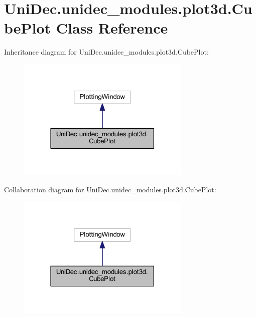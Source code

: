 \hypertarget{class_uni_dec_1_1unidec__modules_1_1plot3d_1_1_cube_plot}{}\section{Uni\+Dec.\+unidec\+\_\+modules.\+plot3d.\+Cube\+Plot Class Reference}
\label{class_uni_dec_1_1unidec__modules_1_1plot3d_1_1_cube_plot}


Inheritance diagram for Uni\+Dec.\+unidec\+\_\+modules.\+plot3d.\+Cube\+Plot\+:\nopagebreak
\begin{figure}[H]
\begin{center}
\leavevmode
\includegraphics[width=234pt]{class_uni_dec_1_1unidec__modules_1_1plot3d_1_1_cube_plot__inherit__graph}
\end{center}
\end{figure}


Collaboration diagram for Uni\+Dec.\+unidec\+\_\+modules.\+plot3d.\+Cube\+Plot\+:\nopagebreak
\begin{figure}[H]
\begin{center}
\leavevmode
\includegraphics[width=234pt]{class_uni_dec_1_1unidec__modules_1_1plot3d_1_1_cube_plot__coll__graph}
\end{center}
\end{figure}
